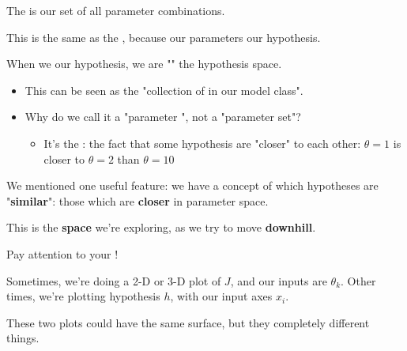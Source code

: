        \begin{definition}
            The  is our set of all  parameter combinations.

            
            
            This is the same as the , because our parameters  our hypothesis.
            
            When we  our hypothesis, we are "" the hypothesis space.

            \subsecdiv

            \begin{itemize}
                \item This can be seen as the "collection of  in our model class".
                \item Why do we call it a "parameter ", not a "parameter set"?
                    \begin{itemize}
                        \item It's the : the fact that some hypothesis are "closer" to each other: $\theta=1$ is closer to $\theta=2$ than $\theta=10$
                    \end{itemize}
            \end{itemize}
        \end{definition}
        
        We mentioned one useful feature: we have a concept of which hypotheses are "\textbf{similar}": those which are \textbf{closer} in parameter space.
        
        This is the \textbf{space} we're exploring, as we try to move \textbf{downhill}. \\
        
        \begin{clarification}
            Pay attention to your ! 
            
            Sometimes, we're doing a 2-D or 3-D plot of $J$, and our inputs are $\theta_k$. Other times, we're plotting hypothesis $h$, with our input axes $x_i$.
            
            These two plots could have the same surface, but they  completely different things.
        \end{clarification}
        

